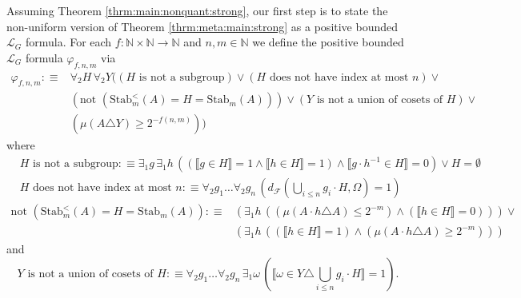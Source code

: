 \documentclass[11pt]{amsart}
\theoremstyle{definition}
\theoremstyle{remark}
\def\NN{\mathbb{N}}
\newcommand{\model}[1]{\llbracket {#1} \rrbracket }
\begin{document}
Assuming Theorem \ref{thrm:main:nonquant:strong}, our first step is to state the non-uniform version of Theorem \ref{thrm:meta:main:strong} as a positive bounded $\mathcal{L}_{G}$ formula. For each $f: \NN \times \NN \to \NN$ and $n,m \in \NN$ we define the  positive bounded $\mathcal{L}_{G}$ formula $\varphi_{f,n,m}$ via
\begin{equation*}
    \begin{aligned}
            \varphi_{f,n,m}:\equiv& \forall_2 H\,\forall_2 Y((\mbox{$H$ is not a subgroup})\lor(\mbox{$H$ does not have index at most $n$})\lor\\
            &(\mbox{not }(\mathrm{Stab}_m^{<}(A)= H  =\mathrm{Stab}_m(A)))\lor (\mbox{$Y$ is not a union of cosets of $H$})\lor\\
            &(\mu(A \triangle Y)\ge 2^{-f(n,m)}))
    \end{aligned}
\end{equation*}
where
\begin{equation*}
    \begin{aligned}
&\mbox{$H$ is not a subgroup}:\equiv \exists_1 g\, \exists_1 h\,((\model{g \in H} = 1 \land \model{h \in H} = 1) \land \model{g\cdot h^{-1} \in H} = 0 ) \lor H = \emptyset\\
& \mbox{$H$ does not have index at most $n$}:\equiv \forall_2 g_1\ldots\forall_2 g_n\,\left( d_{\mathcal{F}}\left(\bigcup_{i\le n}g_i\cdot H, \hat{\Omega}\right)=1  \right)
    \end{aligned}
\end{equation*}
\begin{equation*}
    \begin{aligned}
\mbox{not }(\mathrm{Stab}_m^{<}(A)= H  =\mathrm{Stab}_m(A)):\equiv& (\exists_1 h\,((\mu( A\cdot h \triangle A)\le 2^{-m})\land(\model{h \in H} = 0) ))\lor \\
&(\exists_1 h\,((\model{h \in H} = 1)\land(\mu(A\cdot h \triangle A)\ge 2^{-m}) ))
    \end{aligned}
\end{equation*}
and
\begin{equation*}
\mbox{$Y$ is not a union of cosets of $H$}:\equiv \forall_2 g_1\ldots\forall_2 g_n\,\exists_1 \omega\,\left( \model{\omega \in Y\triangle \bigcup_{i\le n}g_i\cdot H}=1 \right). 
\end{equation*}
\end{document}
